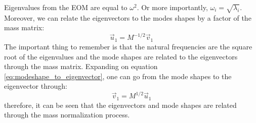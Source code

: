 \documentclass[12pt,letter]{article}
\begin{document}
		
	Eigenvalues from the EOM are equal to $\omega^2$. Or more importantly, $\omega_i = \sqrt{\lambda_i}$. 
	Moreover, we can relate the eigenvectors to the modes shapes by a factor of the mass matrix:
	\begin{equation}
	\vec{u}_1 = M^{-1/2}\vec{v}_1
	\label{eq:modeshape_to_eigenvector}
	\end{equation}
	The important thing to remember is that the natural frequencies are the square root of the eigenvalues and the mode shapes are related to the eigenvectors through the mass matrix. Expanding on equation \ref{eq:modeshape_to_eigenvector}, one can go from the mode shapes to the eigenvector through:
	\begin{equation}
	\vec{v}_1 = M^{1/2}\vec{u}_1
	\end{equation}
	therefore, it can be seen that the eigenvectors and mode shapes are related through the mass normalization process. 
		
	

	
	
\end{document}
